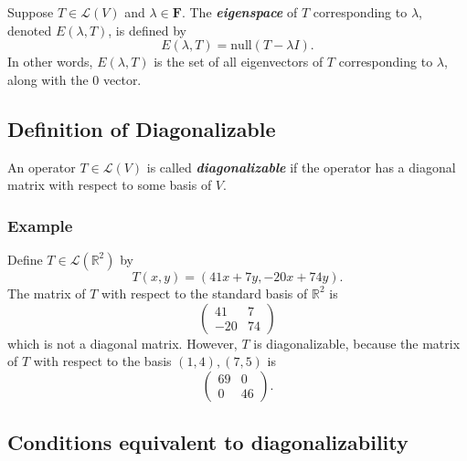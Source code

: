\documentclass[11pt]{article}
\begin{document}
    Suppose \(T \in \mathcal{L}(V)\) and \(\lambda \in \textbf{F}\). The \textbf{\emph{eigenspace}} of $T$ corresponding to \(\lambda\), denoted \(E(\lambda, T)\), is defined by \[E(\lambda, T) = \text{null}(T - \lambda I).\] In other words, \(E(\lambda, T)\) is the set of all eigenvectors of $T$ corresponding to \(\lambda\), along with the 0 vector. 
    
    \subsection{Definition of Diagonalizable}

    An operator \(T \in \mathcal{L}(V)\) is called \textbf{\emph{diagonalizable}} if the operator has a diagonal matrix with respect to some basis of $V$. 

    \subsubsection{Example}

    Define \(T \in \mathcal{L}(\mathbb{R}^2)\) by \[T(x,y) = (41x + 7y, -20x + 74y).\] The matrix of $T$ with respect to the standard basis of \(\mathbb{R}^2\) is 
    \begin{equation*}
        \begin{pmatrix}
            41 & 7 \\ 
            -20 & 74
        \end{pmatrix}
    \end{equation*}
    which is not a diagonal matrix. However, $T$ is diagonalizable, because the matrix of $T$ with respect to the basis \((1,4),(7,5)\) is 
    \begin{equation*}
        \begin{pmatrix}
            69 & 0 \\
            0 & 46
        \end{pmatrix}.
    \end{equation*}

    \subsection{Conditions equivalent to diagonalizability}
\end{document}
